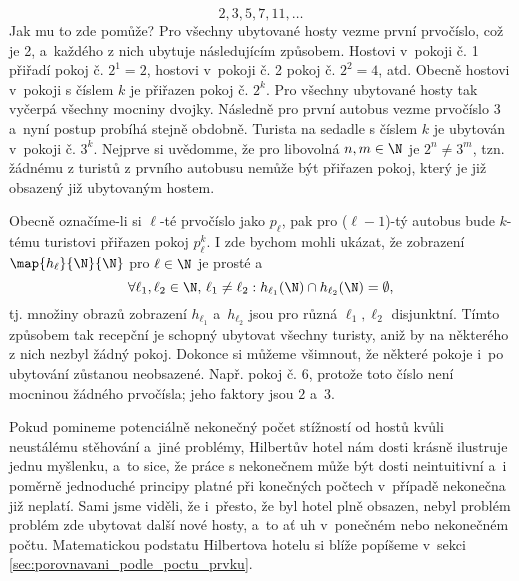\begin{enumerate}[label=\textit{(\roman*)}]
    \begin{equation*}
        2,3,5,7,11,\dots
    \end{equation*}
    Jak mu to zde pomůže? Pro všechny ubytované hosty vezme první prvočíslo, což je 2, a~každého z nich ubytuje následujícím způsobem. Hostovi v~pokoji č. 1 přiřadí pokoj č. $2^1=2$, hostovi v~pokoji č. 2 pokoj č. $2^2=4$, atd. Obecně hostovi v~pokoji s číslem $k$ je přiřazen pokoj č. $2^k$. Pro všechny ubytované hosty tak vyčerpá všechny mocniny dvojky. Následně pro první autobus vezme prvočíslo 3 a~nyní postup probíhá stejně obdobně. Turista na sedadle s číslem $k$ je ubytován v~pokoji č. $3^k$. Nejprve si uvědomme, že pro libovolná $n,m\in\N$ je $2^n\neq 3^m$, tzn. žádnému z turistů z prvního autobusu nemůže být přiřazen pokoj, který je již obsazený již ubytovaným hostem.\par
    Obecně označíme-li si $\ell$-té prvočíslo jako $p_\ell$, pak pro ($\ell-1$)-tý autobus bude $k$-tému turistovi přiřazen pokoj $p_\ell^k$. I zde bychom mohli ukázat, že zobrazení $\map{h_\ell}{\N}{\N}$ pro $\ell\in\N$ je prosté a
    \begin{equation*}
        \forall\ell_1,\ell_2\in\N,\,\ell_1\neq\ell_2: h_{\ell_1}(\N)\cap h_{\ell_2}(\N)=\emptyset,
    \end{equation*}
    tj. množiny obrazů zobrazení $h_{\ell_1}$ a~$h_{\ell_2}$ jsou pro různá $\ell_1,\ell_2$ disjunktní. Tímto způsobem tak recepční je schopný ubytovat všechny turisty, aniž by na některého z nich nezbyl žádný pokoj. Dokonce si můžeme všimnout, že některé pokoje i~po ubytování zůstanou neobsazené. Např. pokoj č. 6, protože toto číslo není mocninou žádného prvočísla; jeho faktory jsou $2$ a~$3$.
\end{enumerate}
Pokud pomineme potenciálně nekonečný počet stížností od hostů kvůli neustálému stěhování a~jiné problémy, Hilbertův hotel nám dosti krásně ilustruje jednu myšlenku, a~to sice, že práce s nekonečnem může být dosti neintuitivní a~i poměrně jednoduché principy platné při konečných počtech v~případě nekonečna již neplatí. Sami jsme viděli, že i~přesto, že byl hotel plně obsazen, nebyl problém problém zde ubytovat další nové hosty, a~to ať uh v~ponečném nebo nekonečném počtu. Matematickou podstatu Hilbertova hotelu si blíže popíšeme v~sekci \ref{sec:porovnavani_podle_poctu_prvku}.